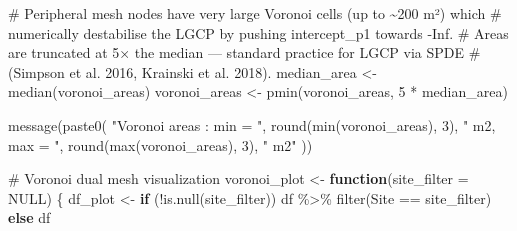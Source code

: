 \documentclass[
  letterpaper,
  DIV=11,
  numbers=noendperiod]{scrartcl}
\newenvironment{Shaded}{\begin{snugshade}}{\end{snugshade}}
\newcommand{\AttributeTok}[1]{\textcolor[rgb]{0.40,0.45,0.13}{#1}}
\newcommand{\CommentTok}[1]{\textcolor[rgb]{0.37,0.37,0.37}{#1}}
\newcommand{\ConstantTok}[1]{\textcolor[rgb]{0.56,0.35,0.01}{#1}}
\newcommand{\ControlFlowTok}[1]{\textcolor[rgb]{0.00,0.23,0.31}{\textbf{#1}}}
\newcommand{\DecValTok}[1]{\textcolor[rgb]{0.68,0.00,0.00}{#1}}
\newcommand{\FunctionTok}[1]{\textcolor[rgb]{0.28,0.35,0.67}{#1}}
\newcommand{\NormalTok}[1]{\textcolor[rgb]{0.00,0.23,0.31}{#1}}
\newcommand{\OtherTok}[1]{\textcolor[rgb]{0.00,0.23,0.31}{#1}}
\newcommand{\SpecialCharTok}[1]{\textcolor[rgb]{0.37,0.37,0.37}{#1}}
\newcommand{\StringTok}[1]{\textcolor[rgb]{0.13,0.47,0.30}{#1}}
\begin{document}
\begin{Shaded}
\begin{Highlighting}[]
  \CommentTok{\# Peripheral mesh nodes have very large Voronoi cells (up to \textasciitilde{}200 m²) which}
  \CommentTok{\# numerically destabilise the LGCP by pushing intercept\_p1 towards {-}Inf.}
  \CommentTok{\# Areas are truncated at 5× the median — standard practice for LGCP via SPDE}
  \CommentTok{\# (Simpson et al. 2016, Krainski et al. 2018).}
\NormalTok{  median\_area }\OtherTok{\textless{}{-}} \FunctionTok{median}\NormalTok{(voronoi\_areas)}
\NormalTok{  voronoi\_areas }\OtherTok{\textless{}{-}} \FunctionTok{pmin}\NormalTok{(voronoi\_areas, }\DecValTok{5} \SpecialCharTok{*}\NormalTok{ median\_area)}

  \FunctionTok{message}\NormalTok{(}\FunctionTok{paste0}\NormalTok{(}
    \StringTok{"Voronoi areas : min = "}\NormalTok{, }\FunctionTok{round}\NormalTok{(}\FunctionTok{min}\NormalTok{(voronoi\_areas), }\DecValTok{3}\NormalTok{),}
    \StringTok{" m2, max = "}\NormalTok{, }\FunctionTok{round}\NormalTok{(}\FunctionTok{max}\NormalTok{(voronoi\_areas), }\DecValTok{3}\NormalTok{), }\StringTok{" m2"}
\NormalTok{  ))}

  \CommentTok{\# Voronoi dual mesh visualization}
\NormalTok{  voronoi\_plot }\OtherTok{\textless{}{-}} \ControlFlowTok{function}\NormalTok{(}\AttributeTok{site\_filter =} \ConstantTok{NULL}\NormalTok{) \{}
\NormalTok{    df\_plot }\OtherTok{\textless{}{-}} \ControlFlowTok{if}\NormalTok{ (}\SpecialCharTok{!}\FunctionTok{is.null}\NormalTok{(site\_filter)) df }\SpecialCharTok{\%\textgreater{}\%} \FunctionTok{filter}\NormalTok{(Site }\SpecialCharTok{==}\NormalTok{ site\_filter) }\ControlFlowTok{else}\NormalTok{ df}


\end{Highlighting}
\end{Shaded}
\end{document}
